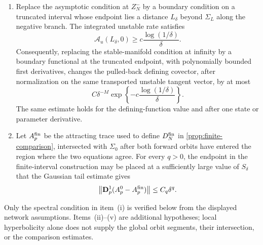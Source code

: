 \begin{assumption}
\begin{enumerate}[label=\textup{(\roman*)}]
\item Replace the asymptotic condition at \(Z_N^-\) by a boundary condition
on a truncated interval whose endpoint lies a distance \(L_\delta\) beyond
\(\Sigma_L\) along the negative branch.  The integrated unstable
rate
satisfies
\begin{equation}
 \mathcal A_u(L_\delta,0)
 \ge c\frac{\log(1/\delta)}{\delta}.
 \label{eq:supp-integrated-unstable-rate}
\end{equation}
Consequently, replacing the stable-manifold condition at infinity by a
boundary functional at the truncated endpoint, with polynomially bounded
first derivatives, changes the
pulled-back defining covector, after normalization on the same transported
unstable tangent vector, by at most
\begin{equation}
 C\delta^{-M}
 \exp\left\{-c\frac{\log(1/\delta)}{\delta}\right\}.
 \label{eq:supp-terminal-decay}
\end{equation}
The same estimate holds for the defining-function value and after one
state or parameter derivative.

\item Let \(A_p^{\rm fin}\) be the attracting trace used to define
\(D_N^{\rm fin}\) in \cref{prop:finite-comparison}, intersected with
\(\Sigma_0\) after both forward orbits have entered the region where the
two equations agree.  For every \(q>0\), the endpoint in the
finite-interval construction may be placed at a sufficiently large value of
\(S_\delta\) that the Gaussian tail estimate gives
\begin{equation}
 \left\lVert\mathbf D_p^1(A_p^0-A_p^{\rm fin})\right\rVert
 \le C_q\delta^q.
 \label{eq:supp-positive-history-comparison}
\end{equation}
\end{enumerate}
\end{assumption}

Only the spectral condition in item~\textup{(i)} is verified below from the
displayed network assumptions.  Items~\textup{(ii)}--\textup{(v)} are
additional hypotheses; local hyperbolicity alone does not supply the global
orbit segments, their intersection, or the comparison estimates.


